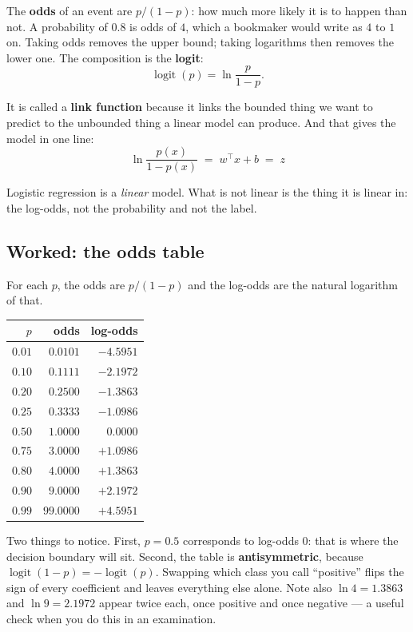 \documentclass[11pt]{article}
\begin{document}
The \textbf{odds} of an event are $p/(1-p)$: how much more likely it is to
happen than not. A probability of $0.8$ is odds of $4$, which a bookmaker
would write as $4$ to $1$ on. Taking odds removes the upper bound; taking
logarithms then removes the lower one. The composition is the \textbf{logit}:
\begin{equation}
  \operatorname{logit}(p) = \ln\frac{p}{1-p} .
  \label{eq:logitdef}
\end{equation}

It is called a \textbf{link function} because it links the bounded thing we
want to predict to the unbounded thing a linear model can produce. And that
gives the model in one line:
\begin{equation}
  \boxed{\;\ln\frac{p(x)}{1 - p(x)} \;=\; w^{\!\top}x + b \;=\; z\;}
  \label{eq:model}
\end{equation}

\begin{keyidea}
Logistic regression is a \emph{linear} model. What is not linear is the thing
it is linear in: the log-odds, not the probability and not the label.
\end{keyidea}

\subsection{Worked: the odds table}
\label{sec:oddstable}

\begin{worked}
For each $p$, the odds are $p/(1-p)$ and the log-odds are the natural
logarithm of that.
\begin{center}
\begin{tabular}{@{}rrr@{}}
\toprule
$p$ & odds & log-odds\\
\midrule
$0.01$ & $0.0101$ & $-4.5951$\\
$0.10$ & $0.1111$ & $-2.1972$\\
$0.20$ & $0.2500$ & $-1.3863$\\
$0.25$ & $0.3333$ & $-1.0986$\\
$0.50$ & $1.0000$ & $\phantom{-}0.0000$\\
$0.75$ & $3.0000$ & $+1.0986$\\
$0.80$ & $4.0000$ & $+1.3863$\\
$0.90$ & $9.0000$ & $+2.1972$\\
$0.99$ & $99.0000$ & $+4.5951$\\
\bottomrule
\end{tabular}
\end{center}
Two things to notice. First, $p = 0.5$ corresponds to log-odds $0$: that is
where the decision boundary will sit. Second, the table is
\textbf{antisymmetric}, because
$\operatorname{logit}(1-p) = -\operatorname{logit}(p)$. Swapping which class
you call ``positive'' flips the sign of every coefficient and leaves
everything else alone. Note also $\ln 4 = 1.3863$ and $\ln 9 = 2.1972$ appear
twice each, once positive and once negative --- a useful check when you do
this in an examination.
\end{worked}
\end{document}
